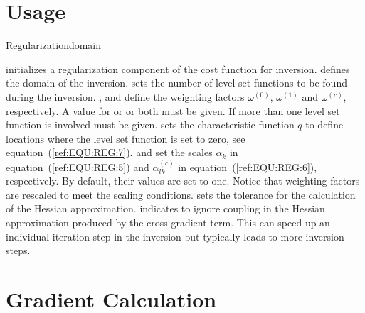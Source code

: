 \section{Usage}


\begin{classdesc}{Regularization}{domain
        }

  
initializes a regularization component of the cost function for inversion. 
 defines the domain of the inversion. 
sets the number of level set functions to be found during the inversion. 
,  and   define the weighting factors
$\omega^{(0)}$,
$\omega^{(1)}$ and
$\omega^{(c)}$, respectively. A value for  or  or both must be given. 
If more than one level set function is involved   must be given. 
 sets the characteristic function $q$ 
to define locations where the level set function is set to zero, see equation~(\ref{ref:EQU:REG:7}).
 and 
 set the scales $\alpha_k$ in equation~(\ref{ref:EQU:REG:5}) and
$\alpha^{(c)}_{lk}$ in equation~(\ref{ref:EQU:REG:6}), respectively. By default, their values are set to one.
Notice that weighting factors are rescaled to meet the scaling conditions.  sets the 
tolerance for the calculation of the Hessian approximation.  
indicates to ignore coupling in the Hessian approximation produced by the 
cross-gradient term. This can speed-up an individual iteration step in the inversion but typically leads to more
inversion steps.
\end{classdesc}

\section{Gradient Calculation}


